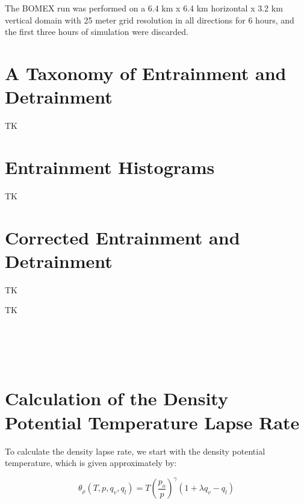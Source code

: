 \documentclass[acp]{copernicus}
\begin{document}
The BOMEX run was performed on a 6.4 km x 6.4 km horizontal x 3.2 km vertical 
domain with 25 meter grid resolution in all directions for 6 hours, and the 
first three hours of simulation were discarded. 


\section{A Taxonomy of Entrainment and Detrainment}

TK


\section{Entrainment Histograms}

TK


\section{Corrected Entrainment and Detrainment}

TK


\conclusions

TK


\appendix
\section{\\ \\ \hspace*{-7mm} Calculation of the Density Potential Temperature Lapse Rate}    %

To calculate the density lapse rate, we start with the density potential 
temperature, which is given approximately by:

\begin{equation}
\label{eq:density_potential_temperature}
  \theta_\rho(T, p, q_v, q_l) = T \left(\frac{p_o}{p}\right)^\gamma (1 + \lambda q_v - q_l)
\end{equation}
\end{document}
